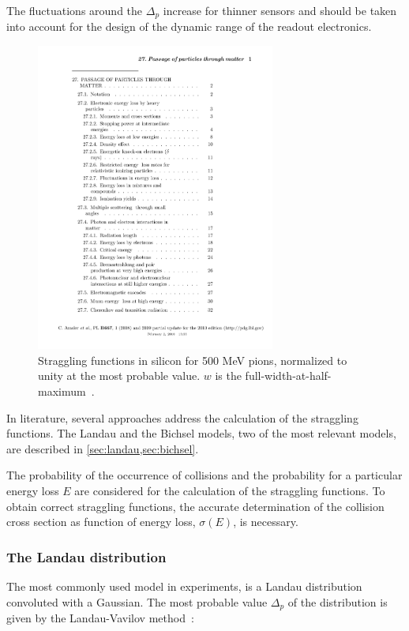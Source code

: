 The fluctuations around the $\Delta_{p}$ increase for thinner sensors
and should be taken into account for the design of the dynamic range
of the readout electronics.


\begin{figure}[htbp]
  \centering
  \includegraphics[width=0.7\textwidth, page=14, trim = 50mm 160mm
    40mm 20mm, clip]{Articles/rpp2009-rev-passage-particles-matter.pdf}
  \caption{Straggling functions in silicon for 500 MeV pions,
    normalized to unity at the most probable value. $w$
    is the full-width-at-half-maximum~\cite{Beringer:1900zz}.}
  \label{fig:LandauDistribution}
\end{figure}

In literature, several approaches address the calculation of the
straggling functions. The Landau and the Bichsel models, two of the
most relevant models, are described in \cref{sec:landau,sec:bichsel}. 

The probability of the occurrence of collisions and the probability
for a particular energy loss $E$ are considered for the calculation of
the straggling functions. To obtain correct straggling functions, the
accurate determination of the collision cross section as function of
energy loss, $\sigma(E)$, is necessary.

\subsubsection{The Landau distribution}\label{sec:landau}
The most commonly used model in experiments, is a Landau distribution
convoluted with a Gaussian. The most probable value $\Delta_p$ of the
distribution is given by the Landau-Vavilov
method~\cite{Landau:1944if,Vavilov:1957zz}:

